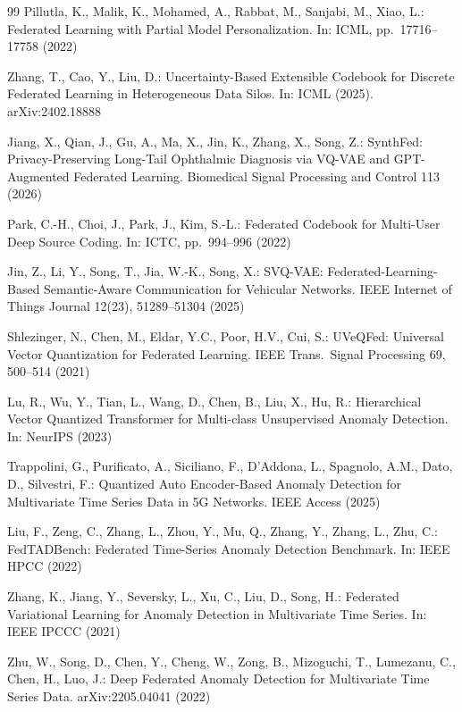 \documentclass[11pt]{article}
\theoremstyle{plain}
\theoremstyle{definition}
\begin{document}
\begin{thebibliography}{99}
Pillutla, K., Malik, K., Mohamed, A., Rabbat, M., Sanjabi, M., Xiao, L.:
Federated Learning with Partial Model Personalization.
In: ICML, pp.\ 17716--17758 (2022)

Zhang, T., Cao, Y., Liu, D.:
Uncertainty-Based Extensible Codebook for Discrete Federated Learning in
Heterogeneous Data Silos. In: ICML (2025). arXiv:2402.18888

Jiang, X., Qian, J., Gu, A., Ma, X., Jin, K., Zhang, X., Song, Z.:
SynthFed: Privacy-Preserving Long-Tail Ophthalmic Diagnosis via VQ-VAE and
GPT-Augmented Federated Learning. Biomedical Signal Processing and Control 113 (2026)

Park, C.-H., Choi, J., Park, J., Kim, S.-L.:
Federated Codebook for Multi-User Deep Source Coding.
In: ICTC, pp.\ 994--996 (2022)

Jin, Z., Li, Y., Song, T., Jia, W.-K., Song, X.:
SVQ-VAE: Federated-Learning-Based Semantic-Aware Communication for Vehicular
Networks. IEEE Internet of Things Journal 12(23), 51289--51304 (2025)

Shlezinger, N., Chen, M., Eldar, Y.C., Poor, H.V., Cui, S.:
UVeQFed: Universal Vector Quantization for Federated Learning.
IEEE Trans.\ Signal Processing 69, 500--514 (2021)

Lu, R., Wu, Y., Tian, L., Wang, D., Chen, B., Liu, X., Hu, R.:
Hierarchical Vector Quantized Transformer for Multi-class Unsupervised Anomaly
Detection. In: NeurIPS (2023)

Trappolini, G., Purificato, A., Siciliano, F., D'Addona, L., Spagnolo, A.M.,
Dato, D., Silvestri, F.:
Quantized Auto Encoder-Based Anomaly Detection for Multivariate Time Series Data
in 5G Networks. IEEE Access (2025)

Liu, F., Zeng, C., Zhang, L., Zhou, Y., Mu, Q., Zhang, Y., Zhang, L., Zhu, C.:
FedTADBench: Federated Time-Series Anomaly Detection Benchmark. In: IEEE HPCC (2022)

Zhang, K., Jiang, Y., Seversky, L., Xu, C., Liu, D., Song, H.:
Federated Variational Learning for Anomaly Detection in Multivariate Time Series.
In: IEEE IPCCC (2021)

Zhu, W., Song, D., Chen, Y., Cheng, W., Zong, B., Mizoguchi, T., Lumezanu, C.,
Chen, H., Luo, J.:
Deep Federated Anomaly Detection for Multivariate Time Series Data. arXiv:2205.04041 (2022)


\end{thebibliography}
\end{document}

